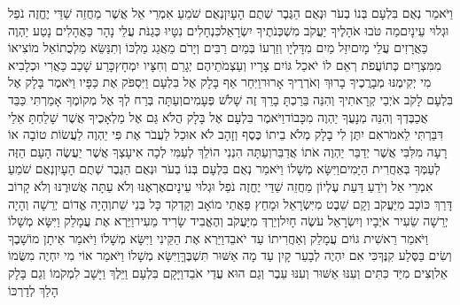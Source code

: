 \documentclass[../main/main.tex]{subfiles}
\begin{document}
\begin{multicols*}{\ncols}
וַיֹּאמַר נְאֻם בִּלְעָם בְּנוֹ בְעֹר וּנְאֻם הַגֶּבֶר שְׁתֻם הָעָיִן\PreVerseSpace{}נְאֻם שֹׁמֵעַ אִמְרֵי אֵל אֲשֶׁר מַחֲזֵה שַׁדַּי יֶחֱזֶה נֹפֵל וּגְלוּי עֵינָיִם\PreVerseSpace{}מַה טֹּבוּ אֹהָלֶיךָ יַעֲקֹב מִשְׁכְּנֹתֶיךָ יִשְׂרָאֵל\PreVerseSpace{}כִּנְחָלִים נִטָּיוּ כְּגַנֹּת עֲלֵי נָהָר כַּאֲהָלִים נָטַע יַהְוֶה כַּאֲרָזִים עֲלֵי מָיִם\PreVerseSpace{}יִזַּל מַיִם מִדָּלְיָו וְזַרְעוֹ בְּמַיִם רַבִּים וְיָרֹם מֵאֲגַג מַלְכּוֹ וְתִנַּשֵּׂא מַלְכֻתוֹ\PreVerseSpace{}אֵל מוֹצִיאוֹ מִמִּצְרַיִם כְּתוֹעֲפֹת רְאֵם לוֹ יֹאכַל גּוֹיִם צָרָיו וְעַצְמֹתֵיהֶם יְגָרֵם וְחִצָּיו יִמְחָץ\PreVerseSpace{}כָּרַע שָׁכַב כַּאֲרִי וּכְלָבִיא מִי יְקִימֶנּוּ מְבָרֲכֶיךָ בָרוּךְ וְאֹרְרֶיךָ אָרוּר\PreVerseSpace{}וַיִּחַר אַף בָּלָק אֶל בִּלְעָם וַיִּסְפֹּק אֶת כַּפָּיו וַיֹּאמֶר בָּלָק אֶל בִּלְעָם לָקֹב אֹיְבַי קְרָאתִיךָ וְהִנֵּה בֵּרַכְתָּ בָרֵךְ זֶה שָׁלֹשׁ פְּעָמִים\PreVerseSpace{}וְעַתָּה בְּרַח לְךָ אֶל מְקוֹמֶךָ אָמַרְתִּי כַּבֵּד אֲכַבֶּדְךָ וְהִנֵּה מְנָעֲךָ יַהְוֶה מִכָּבוֹד\PreVerseSpace{}וַיֹּאמֶר בִּלְעָם אֶל בָּלָק הֲלֹא גַּם אֶל מַלְאָכֶיךָ אֲשֶׁר שָׁלַחְתָּ אֵלַי דִּבַּרְתִּי לֵאמֹר\PreVerseSpace{}אִם יִתֶּן לִי בָלָק מְלֹא בֵיתוֹ כֶּסֶף וְזָהָב לֹא אוּכַל לַעֲבֹר אֶת פִּי יַהְוֶה לַעֲשׂוֹת טוֹבָה אוֹ רָעָה מִלִּבִּי אֲשֶׁר יְדַבֵּר יַהְוֶה אֹתוֹ אֲדַבֵּר\PreVerseSpace{}וְעַתָּה הִנְנִי הוֹלֵךְ לְעַמִּי לְכָה אִיעָצְךָ אֲשֶׁר יַעֲשֶׂה הָעָם הַזֶּה לְעַמְּךָ בְּאַחֲרִית הַיָּמִים\PreVerseSpace{}וַיִּשָּׂא מְשָׁלוֹ וַיֹּאמַר נְאֻם בִּלְעָם בְּנוֹ בְעֹר וּנְאֻם הַגֶּבֶר שְׁתֻם הָעָיִן\PreVerseSpace{}נְאֻם שֹׁמֵעַ אִמְרֵי אֵל וְיֹדֵעַ דַּעַת עֶלְיוֹן מַחֲזֵה שַׁדַּי יֶחֱזֶה נֹפֵל וּגְלוּי עֵינָיִם\PreVerseSpace{}אֶרְאֶנּוּ וְלֹא עַתָּה אֲשׁוּרֶנּוּ וְלֹא קָרוֹב דָּרַךְ כּוֹכָב מִיַּעֲקֹב וְקָם שֵׁבֶט מִיִּשְׂרָאֵל וּמָחַץ פַּאֲתֵי מוֹאָב וְקָדְקֹד\SubEnd{} כָּל בְּנֵי שֵׁת\PreVerseSpace{}וְהָיָה אֱדוֹם יְרֵשָׁה וְהָיָה יְרֵשָׁה שֵׂעִיר אֹיְבָיו וְיִשְׂרָאֵל עֹשֶׂה חָיִל\PreVerseSpace{}וְיֵרְדְּ מִיַּעֲקֹב וְהֶאֱבִיד שָׂרִיד מֵעִיר\PreVerseSpace{}וַיַּרְא אֶת עֲמָלֵק וַיִּשָּׂא מְשָׁלוֹ וַיֹּאמַר רֵאשִׁית גּוֹיִם עֲמָלֵק וְאַחֲרִיתוֹ עַד יֹאבֵד\SubEnd{}\PreVerseSpace{}וַיַּרְא אֶת הַקֵּינִי וַיִּשָּׂא מְשָׁלוֹ וַיֹּאמַר אֵיתָן מוֹשָׁבֶךָ וְשִׂים בַּסֶּלַע קִנֶּךָ\PreVerseSpace{}כִּי אִם יִהְיֶה לְבָעֵר קָיִן עַד מָה אַשּׁוּר תִּשְׁבֶּךָּ\PreVerseSpace{}וַיִּשָּׂא מְשָׁלוֹ וַיֹּאמַר אוֹי מִי יִחְיֶה מִשֻּׂמוֹ אֵל\PreVerseSpace{}וְצִים מִיַּד כִּתִּים וְעִנּוּ אַשּׁוּר וְעִנּוּ עֵבֶר וְגַם הוּא עֲדֵי אֹבֵד\PreVerseSpace{}וַיָּקָם בִּלְעָם וַיֵּלֶךְ וַיָּשָׁב לִמְקֹמוֹ וְגַם בָּלָק הָלַךְ לְדַרְכּוֹ\OpenSection{}\par

\end{multicols*}
\end{document}
